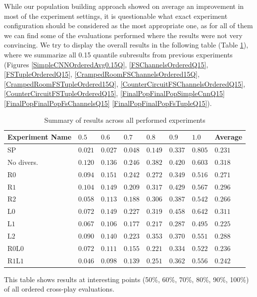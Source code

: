 While our population building approach showed on average an improvement in most of the experiment settings, it is questionable what exact experiment configuration should be considered as the most appropriate one, as for all of them we can find some of the evaluations performed where the results were not very convincing.
We try to display the overall results in the following table (Table \ref{tab:exp_settings_results}), where we summarize all 0.15 quantile subresults from previous experiments (Figures \ref{SimpleCNNOrderedAvg0.15Q}, \ref{FSChannelsOrderedQ15}, \ref{FSTupleOrderedQ15}, \ref{CrampedRoomFSChannelsOrdered15Q}, \ref{CrampedRoomFSTupleOrdered15Q}, \ref{CounterCircuitFSChannelsOrderedQ15}, \ref{CounterCircuitFSTupleOrderedQ15}, \ref{FinalPopFinalPopSimpleCnnQ15} \ref{FinalPopFinalPopFsChannelsQ15} \ref{FinalPopFinalPopFsTupleQ15}).
\begin{table}[tbp]
    \small
    \centering
    \begin{tabular}{l|llllll|l}
      \toprule
      Experiment Name        & $0.5$     & $0.6$  & $0.7$  & $0.8$  & $0.9$  & $1.0$ & Average          \\ \midrule
      SP           & $0.021$ & $0.027$ & $0.048$ & $0.149$ & $0.337$ & $0.805$ & $0.231$   \\\midrule

      No divers.   & $0.120$ & $0.136$ & $0.246$ & $0.382$ & $0.420$ & $0.603$ & $0.318$ \\\midrule
      R$0$         & $0.094$ & $0.151$ & $0.242$ & $0.272$ & $0.349$ & $0.516$ & $0.271$ \\
      R$1$         & $0.104$ & $0.149$ & $0.209$ & $0.317$ & $0.429$ & $0.567$ & $0.296$ \\
      R$2$         & $0.058$ & $0.113$ & $0.188$ & $0.306$ & $0.387$ & $0.542$ & $0.266$ \\\midrule
      L$0$         & $0.072$ & $0.149$ & $0.227$ & $0.319$ & $0.458$ & $0.642$ & $0.311$  \\
      L$1$         & $0.067$ & $0.106$ & $0.177$ & $0.217$ & $0.287$ & $0.495$ & $0.225$  \\
      L$2$         & $0.090$ & $0.140$ & $0.223$ & $0.353$ & $0.370$ & $0.551$ & $0.288$  \\\midrule
      R$0$L$0$     & $0.072$ & $0.111$ & $0.155$ & $0.221$ & $0.334$ & $0.522$ & $0.236$  \\
      R$1$L$1$     & $0.046$ & $0.098$ & $0.139$ & $0.251$ & $0.362$ & $0.556$ & $0.242$  \\
      
      
     \bottomrule
    \end{tabular}
    \caption{Summary of results across all performed experiments}
    \label{tab:exp_settings_results}
    \small
    This table shows results at interesting points (50\%, 60\%, 70\%, 80\%, 90\%, 100\%) of all ordered cross-play evaluations.    
\end{table}
